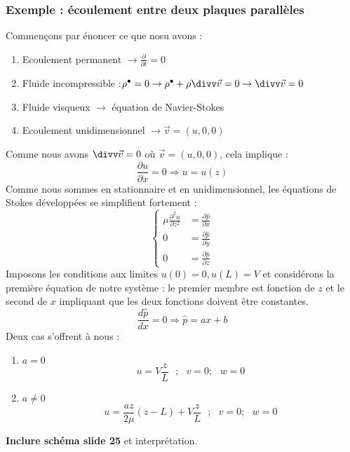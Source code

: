 		\subsubsection{Exemple : écoulement entre deux plaques parallèles}
		Commençons par énoncer ce que nosu avons : 
		\begin{enumerate}
		\item Ecoulement permanent $\rightarrow \frac{\partial}{\partial t}=0$
		\item Fluide incompressible :$\rho^\bullet=0 \rightarrow \rho^\bullet + \rho
		\divv\vec{v}=0 \rightarrow \divv \vec{v}=0$
		\item Fluide visqueux $\rightarrow$ équation de Navier-Stokes
		\item Ecoulement unidimensionnel $\rightarrow \vec{v} = (u,0,0)$
		\end{enumerate}				
		Comme nous avons $\divv \vec v=0$ où $\vec{v}=(u,0,0)$, cela implique :
		\begin{equation}
		\frac{\partial u}{\partial x} = 0 \Rightarrow u = u(z)
		\end{equation}
		Comme nous sommes en stationnaire et en unidimensionnel, les équations 
		de Stokes développées se simplifient fortement :
		\begin{equation}
		\left\{\begin{array}{ll}
		\mu \frac{\partial^2u}{\partial z^2} &= \frac{\partial \hat{p}}{\partial x}\\
		0 &= \frac{\partial \hat{p}}{\partial y}\\
		0 &= \frac{\partial \hat{p}}{\partial z}
		\end{array}\right.
		\end{equation}
		Imposons les conditions aux limites $u(0)=0, u(L)=V$ et considérons la première 
		équation de notre système : le premier membre est fonction de $z$ et le second de
		$x$ impliquant que les deux fonctions doivent être constantes.
		\begin{equation}
		\frac{d\hat{p}}{dx}= 0 \Rightarrow \hat{p}=ax+b
		\end{equation}
		Deux cas s'offrent à nous : 
		\begin{enumerate}
		\item $a=0$\\
		\begin{equation}
		u = V\frac{z}{L}\ \ \ ;\ \ \ v=0;\ \ \ w=0
		\end{equation}
		\item $a\neq0$\\
		\begin{equation}
		u = \frac{az}{2\mu}(z-L) + V\frac{z}{L}\ \ \ ;\ \ \ v=0;\ \ \ w=0
		\end{equation}
		\end{enumerate}
		\textbf{Inclure schéma slide 25} et interprétation.
		
